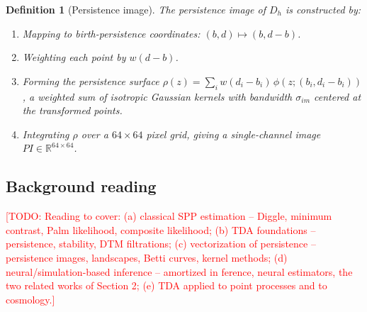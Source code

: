 \documentclass[11pt,letterpaper]{article}
\newcommand{\R}{\mathbb{R}}
\newcommand{\1}{\mathds{1}}
\newcommand{\todo}[1]{\textcolor{red}{[TODO: #1]}}
\newcommand{\fix}[1]{\textcolor{blue}{[FIX: #1]}}
\newcommand{\todo}[1]{}\newcommand{\fix}[1]{}
\theoremstyle{plain}
\theoremstyle{definitioncolon}
\newtheorem{definition}[theorem]{Definition}
\begin{document}
    \begin{definition}[Persistence image]
    \label{def:per_image}
        The persistence image of $D_h$ is constructed by:
            \begin{enumerate}
                \item Mapping to birth-persistence coordinates:
                      $(b,d) \mapsto (b, d-b)$.
                \item Weighting each point by $w(d-b)$.
                \item Forming the persistence surface
                      $\rho(z) = \sum_i w(d_i - b_i)\,
                      \phi(z; (b_i, d_i - b_i))$, a weighted sum of isotropic
                      Gaussian kernels with bandwidth $\sigma_{im}$ centered at
                      the transformed points.
                \item Integrating $\rho$ over a $64 \times 64$ pixel grid,
                      giving a single-channel image $PI \in \R^{64 \times 64}$.
            \end{enumerate}
    \end{definition}


\subsection{Background reading}
\todo{Reading to cover: \newline
 (a) classical SPP estimation -- Diggle, minimum contrast, Palm likelihood,
     composite likelihood; \newline
 (b) TDA foundations -- persistence, stability, DTM filtrations; \newline
 (c) vectorization of persistence -- persistence images, landscapes, Betti
     curves, kernel methods; \newline
 (d) neural/simulation-based inference -- amortized in ference, neural
     estimators, the two related works of Section 2; \newline
 (e) TDA applied to point processes and to cosmology.}


\end{document}
